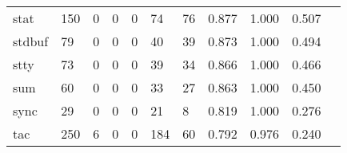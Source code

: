 \begin{longtable}{lp{1.2cm}p{1.2cm}p{1.2cm}p{1.2cm}p{1.2cm}p{1.2cm}p{1.2cm}p{1.2cm}p{1.2cm}p{1.2cm}}
stat      &                                   150 &                                                  0 &                                                  0 &                                                  0 &                                                 74 &                                                 76 &                                         0.877 &                                              1.000 &                                              0.507 \\
stdbuf    &                                    79 &                                                  0 &                                                  0 &                                                  0 &                                                 40 &                                                 39 &                                         0.873 &                                              1.000 &                                              0.494 \\
stty      &                                    73 &                                                  0 &                                                  0 &                                                  0 &                                                 39 &                                                 34 &                                         0.866 &                                              1.000 &                                              0.466 \\
sum       &                                    60 &                                                  0 &                                                  0 &                                                  0 &                                                 33 &                                                 27 &                                         0.863 &                                              1.000 &                                              0.450 \\
sync      &                                    29 &                                                  0 &                                                  0 &                                                  0 &                                                 21 &                                                  8 &                                         0.819 &                                              1.000 &                                              0.276 \\
tac       &                                   250 &                                                  6 &                                                  0 &                                                  0 &                                                184 &                                                 60 &                                         0.792 &                                              0.976 &                                              0.240 \\

\end{longtable}
